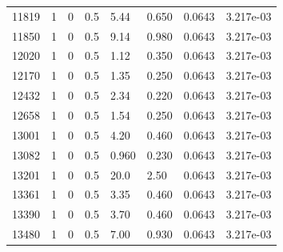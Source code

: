 \documentclass[preview]{standalone}
\begin{document}
{{{{{\begin{tabular}{L{1.2cm}C{1.2cm} C{0.3cm}C{0.5cm} C{1.4cm}C{1.4cm} C{1.4cm}C{1.4cm}}
  11819  &     1  & 0     & 0.5 &  5.44  & 0.650  & 0.0643 &  3.217e-03   \\ 
  11850  &     1  & 0     & 0.5 &  9.14  & 0.980  & 0.0643 &  3.217e-03   \\ 
  12020  &     1  & 0     & 0.5 &  1.12  & 0.350  & 0.0643 &  3.217e-03   \\ 
  12170  &     1  & 0     & 0.5 &  1.35  & 0.250  & 0.0643 &  3.217e-03   \\ 
  12432  &     1  & 0     & 0.5 &  2.34  & 0.220  & 0.0643 &  3.217e-03   \\ 
  12658  &     1  & 0     & 0.5 &  1.54  & 0.250  & 0.0643 &  3.217e-03   \\ 
  13001  &     1  & 0     & 0.5 &  4.20  & 0.460  & 0.0643 &  3.217e-03   \\ 
  13082  &     1  & 0     & 0.5 &  0.960  & 0.230  & 0.0643 &  3.217e-03   \\ 
  13201  &     1  & 0     & 0.5 &  20.0  & 2.50  & 0.0643 &  3.217e-03   \\ 
  13361  &     1  & 0     & 0.5 &  3.35  & 0.460  & 0.0643 &  3.217e-03   \\ 
  13390  &     1  & 0     & 0.5 &  3.70  & 0.460  & 0.0643 &  3.217e-03   \\ 
  13480  &     1  & 0     & 0.5 &  7.00  & 0.930  & 0.0643 &  3.217e-03   \\ 
\hline 
\end{tabular} 

}}}}}
\end{document}
